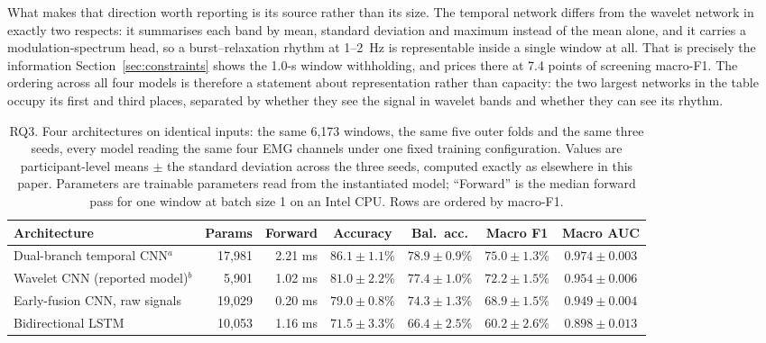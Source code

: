 \documentclass[pdflatex,sn-nature,iicol]{sn-jnl}
\begin{document}
What makes that direction worth reporting is its source rather than its size. The temporal network differs from the wavelet network in exactly two respects: it summarises each band by mean, standard deviation and maximum instead of the mean alone, and it carries a modulation-spectrum head, so a burst--relaxation rhythm at 1--2~Hz is representable inside a single window at all. That is precisely the information Section~\ref{sec:constraints} shows the 1.0-s window withholding, and prices there at 7.4 points of screening macro-F1. The ordering across all four models is therefore a statement about representation rather than capacity: the two largest networks in the table occupy its first and third places, separated by whether they see the signal in wavelet bands and whether they can see its rhythm.

\begin{table}[t]
  \centering
  \caption{RQ3. Four architectures on identical inputs: the same 6,173 windows, the same five outer folds and the same three seeds, every model reading the same four EMG channels under one fixed training configuration. Values are participant-level means $\pm$ the standard deviation across the three seeds, computed exactly as elsewhere in this paper. Parameters are trainable parameters read from the instantiated model; ``Forward'' is the median forward pass for one window at batch size 1 on an Intel CPU. Rows are ordered by macro-F1.}
  \label{tab:architectures}
  \footnotesize
  \begin{tabular*}{\textwidth}{@{\extracolsep{\fill}}lrrcccc@{}}
    \toprule
    Architecture & Params & Forward & Accuracy & Bal.\ acc. & Macro F1 & Macro AUC \\
    \midrule
    Dual-branch temporal CNN$^{a}$ & 17,981 & 2.21 ms & $\mathbf{86.1 \pm 1.1}$\% & $\mathbf{78.9 \pm 0.9}$\% & $\mathbf{75.0 \pm 1.3}$\% & $\mathbf{0.974 \pm 0.003}$ \\
    Wavelet CNN (reported model)$^{b}$ & 5,901 & 1.02 ms & $81.0 \pm 2.2$\% & $77.4 \pm 1.0$\% & $72.2 \pm 1.5$\% & $0.954 \pm 0.006$ \\
    Early-fusion CNN, raw signals & 19,029 & 0.20 ms & $79.0 \pm 0.8$\% & $74.3 \pm 1.3$\% & $68.9 \pm 1.5$\% & $0.949 \pm 0.004$ \\
    Bidirectional LSTM & 10,053 & 1.16 ms & $71.5 \pm 3.3$\% & $66.4 \pm 2.5$\% & $60.2 \pm 2.6$\% & $0.898 \pm 0.013$ \\
    \bottomrule
  \end{tabular*}
  \begin{flushleft}\footnotesize

\end{flushleft}
\end{table}
\end{document}

